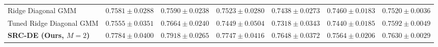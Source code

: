 \begin{table}[t]
\begin{center}
\begin{small}
\begin{tabular}{lcccccc}
Ridge Diagonal GMM & $0.7581 \pm 0.0288$ & $0.7590 \pm 0.0238$ & $0.7523 \pm 0.0280$ & $0.7438 \pm 0.0273$ & $0.7460 \pm 0.0183$ & $0.7520 \pm 0.0036$ \\
Tuned Ridge Diagonal GMM & $0.7555 \pm 0.0351$ & $0.7664 \pm 0.0240$ & $0.7449 \pm 0.0504$ & $0.7318 \pm 0.0343$ & $0.7440 \pm 0.0185$ & $0.7592 \pm 0.0049$ \\
\bf SRC-DE (Ours, $M=2$) & \bf $0.7784 \pm 0.0400$ & \bf $0.7918 \pm 0.0265$ & \bf $0.7747 \pm 0.0416$ & \bf $0.7648 \pm 0.0372$ & \bf $0.7564 \pm 0.0206$ & \bf $0.7630 \pm 0.0029$ \\
\bottomrule
\end{tabular}
\end{small}
\end{center}
\vskip -0.1in
\end{table}

